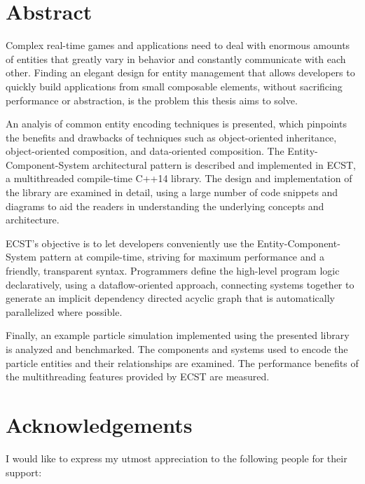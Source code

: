 \documentclass[twoside, 12pt, a4paper, openany]{book}
\begin{document}
\chapter*{Abstract}\label{abstract}

Complex real-time games and applications need to deal with enormous
amounts of entities that greatly vary in behavior and constantly
communicate with each other. Finding an elegant design for entity
management that allows developers to quickly build applications from
small composable elements, without sacrificing performance or
abstraction, is the problem this thesis aims to solve.

An analyis of common entity encoding techniques is presented, which
pinpoints the benefits and drawbacks of techniques such as
object-oriented inheritance, object-oriented composition, and
data-oriented composition. The Entity-Component-System architectural
pattern is described and implemented in ECST, a multithreaded
compile-time C++14 library. The design and implementation of the library
are examined in detail, using a large number of code snippets and
diagrams to aid the readers in understanding the underlying concepts and
architecture.

ECST's objective is to let developers conveniently use the
Entity-Component-System pattern at compile-time, striving for maximum
performance and a friendly, transparent syntax. Programmers define the
high-level program logic declaratively, using a dataflow-oriented
approach, connecting systems together to generate an implicit dependency
directed acyclic graph that is automatically parallelized where
possible.

Finally, an example particle simulation implemented using the presented
library is analyzed and benchmarked. The components and systems used to
encode the particle entities and their relationships are examined. The
performance benefits of the multithreading features provided by ECST are
measured.

\chapter*{Acknowledgements}\label{acknowledgements}

I would like to express my utmost appreciation to the following people
for their support:
\end{document}
